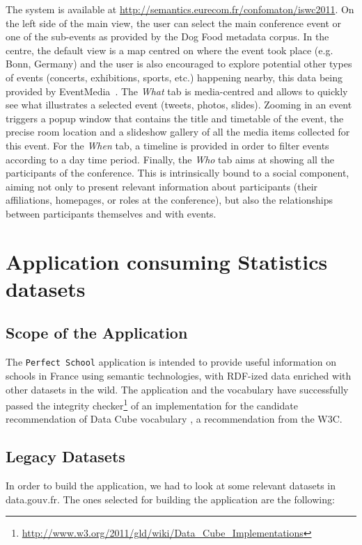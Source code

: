 The system is available at \url{http://semantics.eurecom.fr/confomaton/iswc2011}. On the left side of the main view, the user can select the main conference event or one of the sub-events as provided by the Dog Food metadata corpus. In the centre, the default view is a map centred on where the event took place (e.g. Bonn, Germany) and the user is also encouraged to explore potential other types of events (concerts, exhibitions, sports, etc.) happening nearby, this data being provided by EventMedia~\cite{Troncy:ISEMANTICS10}. The \textit{What} tab is media-centred and allows to quickly see what illustrates a selected event (tweets, photos, slides). Zooming in an event triggers a popup window that contains the title and timetable of the event, the precise room location and a slideshow gallery of all the media items collected for this event. For the \textit{When} tab, a timeline is provided in order to filter events according to a day time period. Finally, the \textit{Who} tab aims at showing all the participants of the conference. This is intrinsically bound to a social component, aiming not only to present relevant information about participants (their affiliations, homepages, or roles at the conference), but also the relationships between participants themselves and with events.


\section{Application consuming Statistics datasets}
\label{sec:perfectSchool}

\subsection{Scope of the Application}
The \texttt{Perfect School} application is intended to provide useful information on schools in France using semantic technologies, with RDF-ized data enriched with other datasets in the wild. The application and the vocabulary have successfully passed the integrity checker\footnote{\url{http://www.w3.org/2011/gld/wiki/Data_Cube_Implementations}}  of an implementation for the candidate recommendation of Data Cube vocabulary \cite{dcube}, a recommendation from the W3C.

\subsection{Legacy Datasets}
In order to build the application, we had to look at some relevant datasets in data.gouv.fr. The ones selected for building the application are the following:

